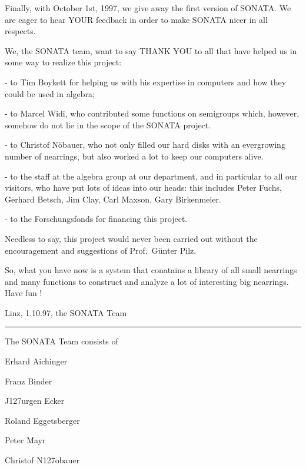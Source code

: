Finally, with October 1st, 1997, we give away the first version
of SONATA. We are eager to hear YOUR feedback in order 
to make SONATA nicer in all respects. 

We, the SONATA team, want to say THANK YOU to all that
have helped us in some way to realize this project:

\begingroup

\smallskip \parindent4pc \parskip 0pt
\item{-} to Tim Boykett for helping us with his expertise
        in computers and how they could be used in algebra;
\item{-} to Marcel Widi, who contributed some functions on semigroups which,
        however, somehow do not lie in the scope of the SONATA project.
\item{-} to Christof N\"obauer, who not only filled our hard disks 
        with an evergrowing number of nearrings, but also 
        worked a lot to keep our computers alive.
\item{-} to the staff at the algebra group at our department,
        and in particular to all our visitors, who have put lots
        of ideas into our heads: this includes Peter Fuchs,
        Gerhard Betsch,  Jim Clay, Carl Maxson, Gary Birkenmeier.
\item{-} to the Forschungsfonds for financing this project.

\endgroup

Needless to say, this project would never been carried out
without the encouragement and suggestions of Prof.~G\"unter Pilz.

So, what you have now is a system that conatains a library of 
all small nearrings and many functions to construct and analyze  a lot
of interesting big nearrings. 
Have fun !


Linz, 1.10.97,  the SONATA Team\*

\vfill\hrule

\noindent\llap{\*\enspace}The SONATA Team consists of

\smallskip \parindent4pc \parskip 0pt
\item{} Erhard Aichinger
\item{} Franz Binder
\item{} J\accent127urgen Ecker
\item{} Roland Eggetsberger
\item{} Peter Mayr
\item{} Christof N\accent127obauer
        
\endgroup
